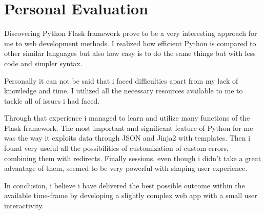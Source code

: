 \documentclass[10pt, a4paper]{article}
\begin{document}
	
    \section{Personal Evaluation}
    Discovering Python Flask framework prove to be a very interesting approach for me to web development methods. I realized how efficient Python is compared to other similar languages but also how easy is to do the same things but with less code and simpler syntax.
    
    Personally it can not be said that i faced difficulties apart from my lack of knowledge and time. I utilized all the necessary resources available to me to tackle all of issues i had faced.
    
    Through that experience i managed to learn and utilize many functions of the Flask framework. The most important and significant feature of Python for me was the way it exploits data through JSON and Jinja2 with templates. Then i found very useful all the possibilities of customization of custom errors, combining them with redirects. Finally sessions, even though i didn't take a great advantage of them, seemed to be very powerful with shaping user experience. 
    
    In conclusion, i believe i have delivered the best possible outcome within the available time-frame by developing a slightly complex web app with a small user interactivity.
		
\end{document}

